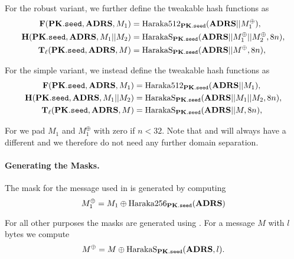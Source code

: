   For the robust variant, we further define the tweakable hash functions as
   \begin{equation}
   \begin{aligned}
      \mathbf{F}(\mathbf{PK}.\texttt{seed}, \textbf{ADRS}, M_1) &= \text{Haraka}512_{\mathbf{PK}.\texttt{seed}}(\textbf{ADRS} || M_1^{\oplus}),\\
      \mathbf{H}(\mathbf{PK}.\texttt{seed}, \textbf{ADRS}, M_1 || M_2) &=  \text{HarakaS}_{\mathbf{PK}.\texttt{seed}}(\textbf{ADRS} ||
                                           M_1^{\oplus} || M_2^{\oplus}, 8n),\\
      \mathbf{T}_\ell(\mathbf{PK}.\texttt{seed}, \textbf{ADRS}, M) &=  \text{HarakaS}_{\mathbf{PK}.\texttt{seed}}(\textbf{ADRS} || M^{\oplus}, 8n),\\
   \end{aligned}
   \end{equation}

   For the simple variant, we instead define the tweakable hash functions as
   \begin{equation}
   \begin{aligned}
      \mathbf{F}(\mathbf{PK}.\texttt{seed}, \textbf{ADRS}, M_1) &= \text{Haraka}512_{\mathbf{PK}.\texttt{seed}}(\textbf{ADRS} || M_1),\\
      \mathbf{H}(\mathbf{PK}.\texttt{seed}, \textbf{ADRS}, M_1 || M_2) &=  \text{HarakaS}_{\mathbf{PK}.\texttt{seed}}(\textbf{ADRS} ||
                                           M_1 || M_2, 8n),\\
      \mathbf{T}_\ell(\mathbf{PK}.\texttt{seed}, \textbf{ADRS}, M) &=  \text{HarakaS}_{\mathbf{PK}.\texttt{seed}}(\textbf{ADRS} || M, 8n),\\
   \end{aligned}
   \end{equation}

   For \sphincsF we pad $M_1$ and $M_1^{\oplus}$ with zero if $n < 32$.
   Note that \sphincsH
   and \sphincsHmsg will always have a different \adrs and we therefore do not
   need any further domain separation.

   \paragraph{Generating the Masks.} The mask for the message used in \sphincsF
   is generated by computing
   \begin{equation}
      M_1^{\oplus} = M_1 \oplus \text{Haraka}256_{\mathbf{PK}.\texttt{seed}}(\textbf{ADRS})
   \end{equation}

   For all other purposes the masks are generated using \harakasponge. For a
   message $M$ with $l$ bytes we compute
   \begin{equation*}
      M^{\oplus} = M \oplus \text{HarakaS}_{\mathbf{PK}.\texttt{seed}}(\textbf{ADRS}, l).
   \end{equation*}

